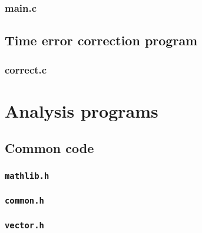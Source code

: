 \begin{scriptsize}

\end{scriptsize}

\subsubsection{main.c}

\begin{scriptsize}

\end{scriptsize}

\subsection{Time error correction program}

\subsubsection{correct.c}

\begin{scriptsize}

\end{scriptsize}

\section{Analysis programs}

\subsection{Common code}

\subsubsection{\texttt{mathlib.h}}

\begin{scriptsize}

\end{scriptsize}

\subsubsection{\texttt{common.h}}

\begin{scriptsize}

\end{scriptsize}

\subsubsection{\texttt{vector.h}}

